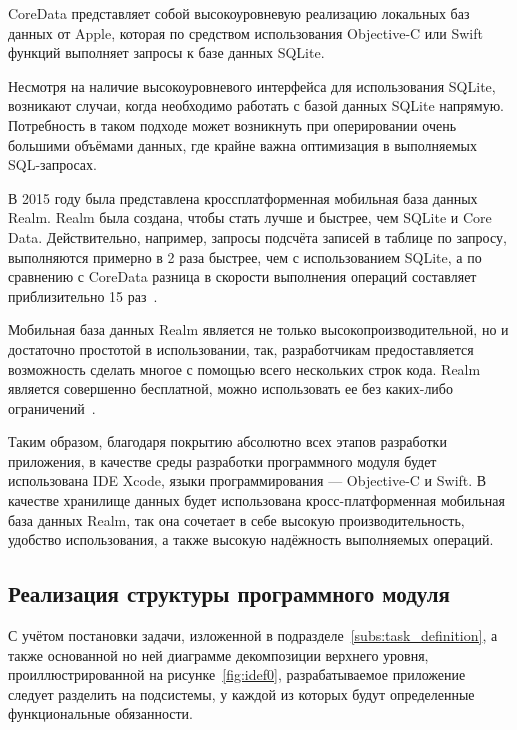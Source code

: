 CoreData представляет собой высокоуровневую реализацию локальных баз данных от Apple,
которая по средством использования Objective-C или Swift функций
выполняет запросы к базе данных SQLite.

Несмотря на наличие высокоуровневого интерфейса для использования SQLite,
возникают случаи, когда необходимо работать с базой данных SQLite напрямую.
Потребность в таком подходе может возникнуть при оперировании очень большими
объёмами данных, где крайне важна оптимизация в выполняемых SQL-запросах.

В 2015 году была представлена кроссплатформенная мобильная база данных Realm.
Realm была создана, чтобы стать лучше и быстрее, чем SQLite и Core Data.
Действительно, например, запросы подсчёта записей в таблице по запросу,
выполняются примерно в 2 раза быстрее, чем с использованием SQLite,
а по сравнению с CoreData разница в скорости выполнения операций составляет
приблизительно 15 раз~\cite{core_data_diff, core_data_vs_sqlite}.

Мобильная база данных Realm является не только высокопроизводительной,
но и достаточно простотой в использовании, так, разработчикам предоставляется возможность
сделать многое с помощью всего нескольких строк кода. Realm является
совершенно бесплатной, можно использовать ее без каких-либо ограничений~\cite{todo_swift_realm}.


Таким образом, благодаря покрытию абсолютно всех этапов разработки приложения,
в качестве среды разработки программного модуля будет использована IDE Xcode,
языки программирования --- Objective-C и Swift.
В качестве хранилище данных будет использована кросс-платформенная мобильная
база данных Realm, так она сочетает в себе высокую производительность,
удобство использования, а также высокую надёжность выполняемых операций.

\pagebreak



\subsection{Реализация структуры программного модуля}

С учётом постановки задачи, изложенной в подразделе~\ref{subs:task_definition},
а также основанной но ней диаграмме декомпозиции верхнего уровня,
проиллюстрированной на рисунке~\ref{fig:idef0}, разрабатываемое
приложение следует разделить на подсистемы, у каждой из которых будут
определенные функциональные обязанности.


